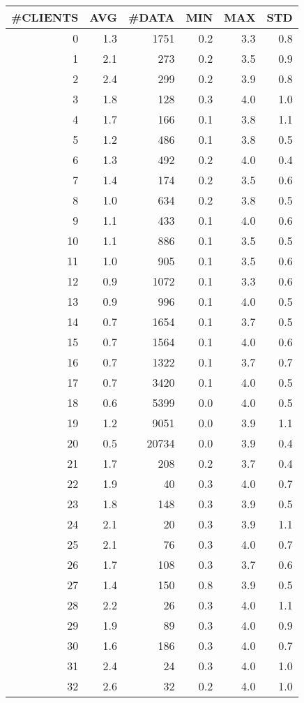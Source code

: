 \begin{tabular}{|r|r|r|r|r|r|}
\hline
 \#CLIENTS & AVG & \#DATA & MIN & MAX & STD\\
\hline
0 &  1.3 & 1751 & 0.2 & 3.3 & 0.8\\
1 &  2.1 & 273 & 0.2 & 3.5 & 0.9\\
2 &  2.4 & 299 & 0.2 & 3.9 & 0.8\\
3 &  1.8 & 128 & 0.3 & 4.0 & 1.0\\
4 &  1.7 & 166 & 0.1 & 3.8 & 1.1\\
5 &  1.2 & 486 & 0.1 & 3.8 & 0.5\\
6 &  1.3 & 492 & 0.2 & 4.0 & 0.4\\
7 &  1.4 & 174 & 0.2 & 3.5 & 0.6\\
8 &  1.0 & 634 & 0.2 & 3.8 & 0.5\\
9 &  1.1 & 433 & 0.1 & 4.0 & 0.6\\
10 &  1.1 & 886 & 0.1 & 3.5 & 0.5\\
11 &  1.0 & 905 & 0.1 & 3.5 & 0.6\\
12 &  0.9 & 1072 & 0.1 & 3.3 & 0.6\\
13 &  0.9 & 996 & 0.1 & 4.0 & 0.5\\
14 &  0.7 & 1654 & 0.1 & 3.7 & 0.5\\
15 &  0.7 & 1564 & 0.1 & 4.0 & 0.6\\
16 &  0.7 & 1322 & 0.1 & 3.7 & 0.7\\
17 &  0.7 & 3420 & 0.1 & 4.0 & 0.5\\
18 &  0.6 & 5399 & 0.0 & 4.0 & 0.5\\
19 &  1.2 & 9051 & 0.0 & 3.9 & 1.1\\
20 &  0.5 & 20734 & 0.0 & 3.9 & 0.4\\
21 &  1.7 & 208 & 0.2 & 3.7 & 0.4\\
22 &  1.9 & 40 & 0.3 & 4.0 & 0.7\\
23 &  1.8 & 148 & 0.3 & 3.9 & 0.5\\
24 &  2.1 & 20 & 0.3 & 3.9 & 1.1\\
25 &  2.1 & 76 & 0.3 & 4.0 & 0.7\\
26 &  1.7 & 108 & 0.3 & 3.7 & 0.6\\
27 &  1.4 & 150 & 0.8 & 3.9 & 0.5\\
28 &  2.2 & 26 & 0.3 & 4.0 & 1.1\\
29 &  1.9 & 89 & 0.3 & 4.0 & 0.9\\
30 &  1.6 & 186 & 0.3 & 4.0 & 0.7\\
31 &  2.4 & 24 & 0.3 & 4.0 & 1.0\\
32 &  2.6 & 32 & 0.2 & 4.0 & 1.0\\

\end{tabular}
